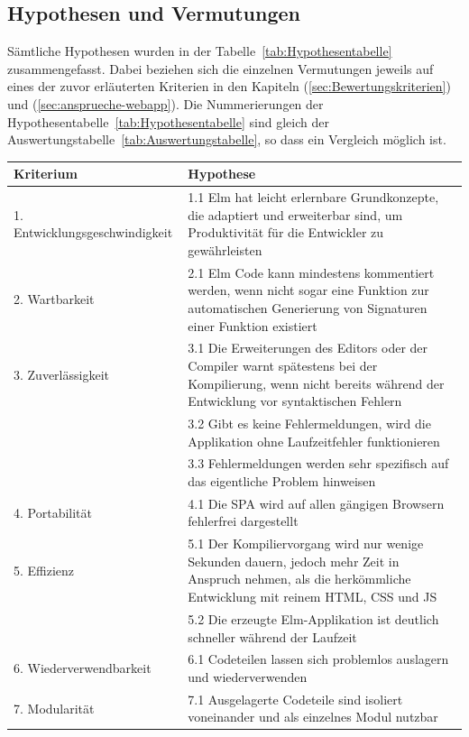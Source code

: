 \subsection{Hypothesen und Vermutungen}
\label{sec:Hypothesen und Vermutungen}
Sämtliche Hypothesen wurden in der Tabelle~\ref{tab:Hypothesentabelle} zusammengefasst. Dabei beziehen sich die einzelnen Vermutungen jeweils auf eines der zuvor erläuterten Kriterien in den Kapiteln  (\ref{sec:Bewertungskriterien}) und  (\ref{sec:ansprueche-webapp}). Die Nummerierungen der Hypothesentabelle~\ref{tab:Hypothesentabelle} sind gleich der Auswertungstabelle~\ref{tab:Auswertungstabelle}, so dass ein Vergleich möglich ist.
\begin{table}[p]
\begin{tabular}{ | l | p{7.6cm} | }
	\hline
	\textbf{Kriterium} &\textbf{Hypothese}\\
	\hline
	1. Entwicklungsgeschwindigkeit & 1.1 Elm hat leicht erlernbare Grundkonzepte, die adaptiert und erweiterbar sind, um Produktivität für die Entwickler zu gewährleisten\\
	\hline
	2. Wartbarkeit & 2.1 Elm Code kann mindestens kommentiert werden, wenn nicht sogar eine Funktion zur automatischen Generierung von Signaturen einer Funktion existiert\\
	\hline
	3. Zuverlässigkeit & 3.1 Die Erweiterungen des Editors oder der Compiler warnt spätestens bei der Kompilierung, wenn nicht bereits während der Entwicklung vor syntaktischen Fehlern\\
	& 3.2  Gibt es keine Fehlermeldungen, wird die Applikation ohne Laufzeitfehler funktionieren\\
	& 3.3  Fehlermeldungen werden sehr spezifisch auf das eigentliche Problem hinweisen\\
	\hline
	4. Portabilität &  4.1 Die \ac{SPA} wird auf allen gängigen Browsern fehlerfrei dargestellt\\
	\hline
	5. Effizienz & 5.1 Der Kompiliervorgang wird nur wenige Sekunden dauern, jedoch mehr Zeit in Anspruch nehmen, als die herkömmliche Entwicklung mit reinem \ac{HTML}, \ac{CSS} und \ac{JS}\\
	&  5.2 Die erzeugte Elm-Applikation ist deutlich schneller während der Laufzeit\\
	\hline
	6. Wiederverwendbarkeit & 6.1 Codeteilen lassen sich problemlos auslagern und wiederverwenden\\
	\hline
	7. Modularität & 7.1 Ausgelagerte Codeteile sind isoliert voneinander und als einzelnes Modul nutzbar\\

\end{tabular}
\end{table}
